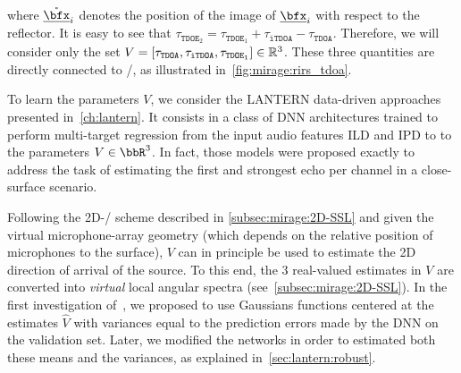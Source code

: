 where $\mathring{\positionMicrophone}_i$ denotes the position of the image of $\positionMicrophone_i$ with respect to the reflector.
It is easy to see that $\tau_{\mathtt{TDOE}_2} =  \tau_{\mathtt{TDOE}_1} + \tau_\mathtt{iTDOA} - \tau_\mathtt{TDOA}$.
Therefore, we will consider only the set $V = \klist{\tau_{\mathtt{TDOA}}, \tau_{\mathtt{iTDOA}}, \tau_{\mathtt{TDOE}_1}}\in\mathbb{R}^3$.
These three quantities are directly connected to \RIRs/, as illustrated in~\cref{fig:mirage:rirs_tdoa}.%

\mynewline
To learn the parameters $V$, we consider the \acs{LANTERN} data-driven approaches presented in~\cref{ch:lantern}.
It consists in a class of \ac{DNN} architectures trained to perform multi-target regression from the input audio features \acf{ILD} and \acf{IPD} to to the parameters $V\in\bbR^3$.
In fact, those models were proposed exactly to address the task of estimating the first and strongest echo per channel in a close-surface scenario.

\mynewline
Following the 2D-\SSL/ scheme described in \cref{subsec:mirage:2D-SSL} and given the virtual microphone-array geometry (which depends on the relative position of microphones to the surface), $V$ can in principle be used to estimate the 2D direction of arrival of the source.
To this end, the 3 real-valued estimates in $V$ are converted into \textit{virtual} local angular spectra (see~\cref{subsec:mirage:2D-SSL}).
In the first investigation of~, we proposed to use Gaussians functions centered at the estimates $\hat{V}$ with variances equal to the prediction errors made by the \ac{DNN} on the validation set.
Later, we modified the networks in order to estimated both these means and the variances, as explained in~\cref{sec:lantern:robust}.


